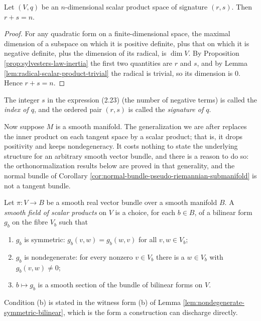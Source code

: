 \begin{corollary}[$r + s = n$, without a basis]
\label{cor:scalar-product-signature-sum}
\leanok
{}
Let $(V,q)$ be an $n$-dimensional scalar product space of signature $(r,s)$. Then $r + s = n$.
\end{corollary}

\begin{proof}
\leanok
{}
For any quadratic form on a finite-dimensional space, the maximal dimension of a subspace on which it is positive definite, plus that on which it is negative definite, plus the dimension of its radical, is $\dim V$. By Proposition \ref{prop:sylvesters-law-inertia} the first two quantities are $r$ and $s$, and by Lemma \ref{lem:radical-scalar-product-trivial} the radical is trivial, so its dimension is $0$. Hence $r + s = n$.
\end{proof}

The integer $s$ in the expression (2.23) (the number of negative terms) is called the \textit{index of $q$}, and the ordered pair $(r, s)$ is called the \textit{signature of $q$}.

Now suppose $M$ is a smooth manifold. The generalization we are after replaces the inner product on each tangent space by a scalar product; that is, it drops positivity and keeps nondegeneracy. It costs nothing to state the underlying structure for an arbitrary smooth vector bundle, and there is a reason to do so: the orthonormalization results below are proved in that generality, and the normal bundle of Corollary \ref{cor:normal-bundle-pseudo-riemannian-submanifold} is not a tangent bundle.

\begin{definition}
\label{def:smooth-field-scalar-products}
\leanok
{}
Let $\pi : V \to B$ be a smooth real vector bundle over a smooth manifold $B$. A \emph{smooth field of scalar products} on $V$ is a choice, for each $b \in B$, of a bilinear form $g_b$ on the fibre $V_b$ such that
\begin{enumerate}[label=(\alph*)]
\item $g_b$ is symmetric: $g_b(v,w) = g_b(w,v)$ for all $v,w \in V_b$;
\item $g_b$ is nondegenerate: for every nonzero $v \in V_b$ there is a $w \in V_b$ with $g_b(v,w) \neq 0$;
\item $b \mapsto g_b$ is a smooth section of the bundle of bilinear forms on $V$.
\end{enumerate}
Condition (b) is stated in the witness form (b) of Lemma \ref{lem:nondegenerate-symmetric-bilinear}, which is the form a construction can discharge directly.
\end{definition}

